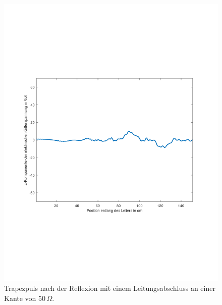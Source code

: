 \documentclass[Protokollheft.tex]{subfiles}
\begin{document}
\begin{figure}[ht]
	\centering
	\includegraphics[trim = 20mm 65mm 20mm 65mm, clip,width=0.7\linewidth]{Aufgabe2_2.pdf}
	\caption{Trapezpuls nach der Reflexion mit einem Leitungsabschluss an einer Kante von $50\,\Omega$.}\label{fig:Aufg2_2}
\end{figure}
\end{document}
